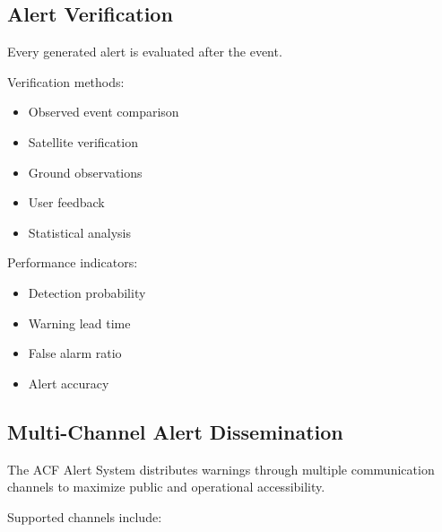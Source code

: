 
\subsection{Alert Verification}

Every generated alert is evaluated after the event.

Verification methods:

\begin{itemize}

\item Observed event comparison

\item Satellite verification

\item Ground observations

\item User feedback

\item Statistical analysis

\end{itemize}


Performance indicators:

\begin{itemize}

\item Detection probability

\item Warning lead time

\item False alarm ratio

\item Alert accuracy

\end{itemize}


\subsection{Multi-Channel Alert Dissemination}

The ACF Alert System distributes warnings through multiple communication
channels to maximize public and operational accessibility.

Supported channels include:

